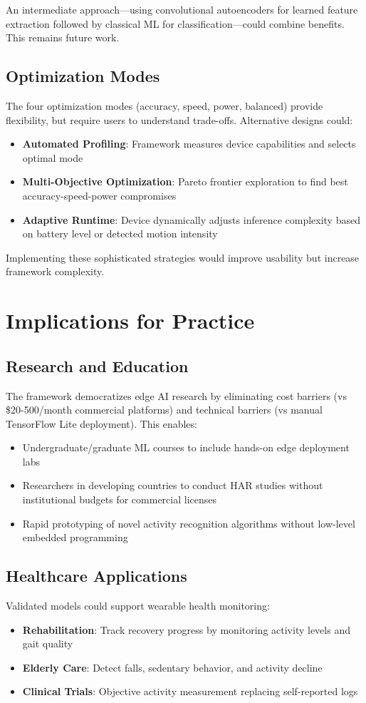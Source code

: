 An intermediate approach—using convolutional autoencoders for learned feature extraction followed by classical ML for classification—could combine benefits. This remains future work.

\subsection{Optimization Modes}
The four optimization modes (accuracy, speed, power, balanced) provide flexibility, but require users to understand trade-offs. Alternative designs could:
\begin{itemize}
    \item \textbf{Automated Profiling}: Framework measures device capabilities and selects optimal mode
    \item \textbf{Multi-Objective Optimization}: Pareto frontier exploration to find best accuracy-speed-power compromises
    \item \textbf{Adaptive Runtime}: Device dynamically adjusts inference complexity based on battery level or detected motion intensity
\end{itemize}

Implementing these sophisticated strategies would improve usability but increase framework complexity.

\section{Implications for Practice}

\subsection{Research and Education}
The framework democratizes edge AI research by eliminating cost barriers (vs \$20-500/month commercial platforms) and technical barriers (vs manual TensorFlow Lite deployment). This enables:
\begin{itemize}
    \item Undergraduate/graduate ML courses to include hands-on edge deployment labs
    \item Researchers in developing countries to conduct HAR studies without institutional budgets for commercial licenses
    \item Rapid prototyping of novel activity recognition algorithms without low-level embedded programming
\end{itemize}

\subsection{Healthcare Applications}
Validated models could support wearable health monitoring:
\begin{itemize}
    \item \textbf{Rehabilitation}: Track recovery progress by monitoring activity levels and gait quality
    \item \textbf{Elderly Care}: Detect falls, sedentary behavior, and activity decline
    \item \textbf{Clinical Trials}: Objective activity measurement replacing self-reported logs
\end{itemize}

